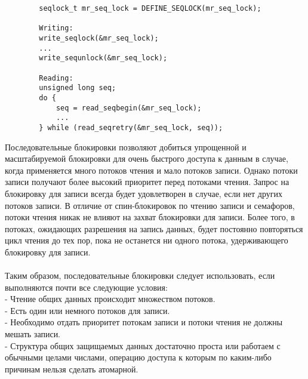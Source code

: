     \begin{lstlisting}
        seqlock_t mr_seq_lock = DEFINE_SEQLOCK(mr_seq_lock);

        Writing:
        write_seqlock(&mr_seq_lock);
        ...
        write_sequnlock(&mr_seq_lock);
        
        Reading:
        unsigned long seq;
        do {
            seq = read_seqbegin(&mr_seq_lock);
            ...
        } while (read_seqretry(&mr_seq_lock, seq));
    \end{lstlisting}
    
    Последовательные блокировки позволяют добиться упрощенной и масштабируемой блокировки для очень быстрого доступа к данным в случае, когда применяется много потоков чтения и мало потоков записи. Однако потоки записи получают более высокий приоритет перед потоками чтения. Запрос на блокировку для записи всегда будет удовлетворен в случае, если нет других потоков записи. В отличие от спин-блокировок по чтению записи и семафоров, потоки чтения никак не влияют на захват блокировки для записи. Более того, в потоках, ожидающих разрешения на запись данных, будет постоянно повторяться цикл чтения до тех пор, пока не останется ни одного потока, удерживающего блокировку для записи.
    \\\\
    Таким образом, последовательные блокировки следует использовать, если выполняются почти все следующие условия:
    \\
    - Чтение общих данных происходит множеством потоков.
    \\
    - Есть один или немного потоков для записи.
    \\
    - Необходимо отдать приоритет потокам записи и потоки чтения не должны мешать записи.
    \\
    - Структура общих защищаемых данных достаточно проста или работаем с обычными целами числами, операцию доступа к которым по каким-либо причинам нельзя сделать атомарной.

